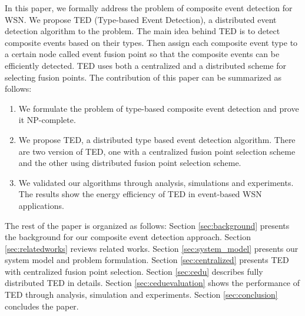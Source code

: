 In this paper, we formally address the problem of composite event detection for WSN. We propose TED (Type-based Event Detection), a distributed event detection algorithm to the problem. The main idea behind TED is to detect composite events based on their types. Then assign each composite event type to a certain node called event fusion point so that the composite events can be efficiently detected. TED uses both a centralized and a distributed scheme for selecting fusion points. The contribution of this paper can be summarized as follows:
\begin{enumerate}
  \item We formulate the problem of type-based composite event detection and prove it NP-complete.
  \item We propose TED, a distributed type based event detection algorithm. There are two version of TED, one with a centralized fusion point selection scheme and the other using distributed fusion point selection scheme.
  \item We validated our algorithms through analysis, simulations and experiments. The results show the energy efficiency of TED in event-based WSN applications.
\end{enumerate}

The rest of the paper is organized as follows: Section \ref{sec:background} presents the background for our composite event detection approach. Section \ref{sec:relatedworks} reviews related works. Section \ref{sec:system_model} presents our system model and problem formulation. Section \ref{sec:centralized} presents TED with centralized fusion point selection. Section \ref{sec:cedu} describes fully distributed TED in details. Section \ref{sec:ceduevaluation} shows the performance of TED through analysis, simulation and experiments. Section \ref{sec:conclusion} concludes the paper.

